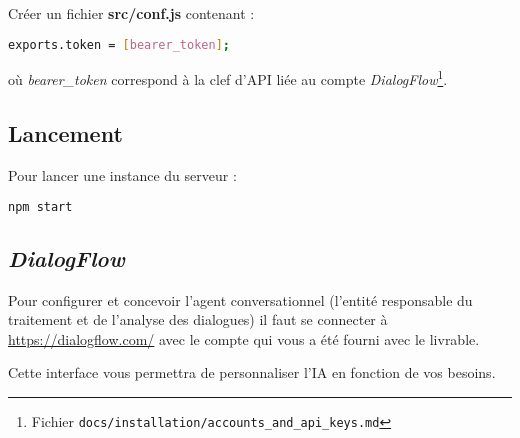 Créer un fichier \textbf{src/conf.js} contenant :
\begin{lstlisting}[language=bash]
    exports.token = [bearer_token];
\end{lstlisting}

où \og \emph{bearer\_token} \fg{} correspond à la clef d'API liée au compte \emph{DialogFlow}\footnote{Fichier \texttt{docs/installation/accounts\_and\_api\_keys.md}}.

\subsection{Lancement}

Pour lancer une instance du serveur :
\begin{lstlisting}[language=bash]
    npm start
\end{lstlisting}

\subsection{\emph{DialogFlow}}

Pour configurer et concevoir l'agent conversationnel (l'entité responsable du traitement et de l'analyse des dialogues) il faut se connecter à \url{https://dialogflow.com/} avec le compte
qui vous a été fourni avec le livrable. 

Cette interface vous permettra de personnaliser l'IA en fonction de vos besoins.

